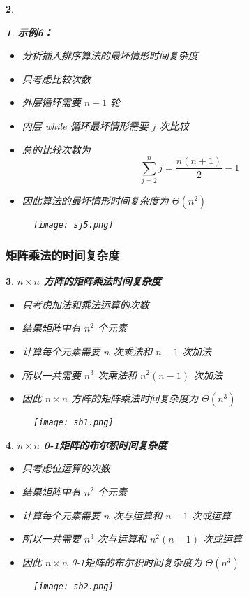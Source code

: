 \documentclass[UTF8]{report}
\theoremstyle{MyLineTheoremStyle} %
\theoremstyle{MyBlockTheoremStyle} %
\theoremstyle{MySubsubsectionStyle} %
\newtheorem{definition}{}
\begin{document}
\begin{definition}
\begin{definition}
    \textbf{示例6：}
    \begin{itemize}
        \item 分析插入排序算法的最坏情形时间复杂度
        \item 只考虑比较次数
        \item 外层循环需要 $n - 1$ 轮
        \item 内层 while 循环最坏情形需要 $j$ 次比较
        \item 总的比较次数为
        \[
        \sum_{j=2}^{n} j = \frac{n(n+1)}{2} - 1
        \]
        \item 因此算法的最坏情形时间复杂度为 $\Theta(n^2)$
    \end{itemize}

    \begin{figure}[ht]
        \centering
        \texttt{[image: sj5.png]}
    \end{figure}
\end{definition}
\end{definition}

\subsubsection{矩阵乘法的时间复杂度}

\begin{definition}
    \textbf{$n \times n$ 方阵的矩阵乘法时间复杂度}
    \begin{itemize}
        \item 只考虑加法和乘法运算的次数
        \item 结果矩阵中有 $n^2$ 个元素
        \item 计算每个元素需要 $n$ 次乘法和 $n - 1$ 次加法
        \item 所以一共需要 $n^3$ 次乘法和 $n^2(n - 1)$ 次加法
        \item 因此 $n × n$ 方阵的矩阵乘法时间复杂度为 $\Theta(n^3)$
    \end{itemize}
    \begin{figure}[ht]
        \centering
        \texttt{[image: sb1.png]}
    \end{figure}
\end{definition}

\begin{definition}
    \textbf{$n \times n$ 0-1矩阵的布尔积时间复杂度}
    \begin{itemize}
        \item 只考虑位运算的次数
        \item 结果矩阵中有 $n^2$ 个元素
        \item 计算每个元素需要 $n$ 次与运算和 $n - 1$ 次或运算
        \item 所以一共需要 $n^3$ 次与运算和 $n^2(n - 1)$ 次或运算
        \item 因此 $n × n$ 0-1矩阵的布尔积时间复杂度为 $\Theta(n^3)$
    \end{itemize}
    \begin{figure}[ht]
        \centering
        \texttt{[image: sb2.png]}
    \end{figure}
\end{definition}
\end{document}
